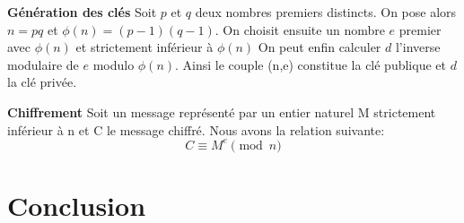\documentclass[a4paper,12pt]{article}
\begin{document}
\textbf{Génération des clés}
Soit $p$ et $q$ deux nombres premiers distincts. On pose alors $n=pq$ et $\phi(n)=(p-1)(q-1)$.
On choisit ensuite un nombre $e$ premier avec $\phi(n)$ et strictement inférieur à $\phi(n)$
On peut enfin calculer $d$ l'inverse modulaire de $e$ modulo $\phi(n)$.
Ainsi le couple (n,e) constitue la clé publique et $d$ la clé privée.


\textbf{Chiffrement}
Soit un message représenté par un entier naturel M strictement inférieur à n et C le message chiffré.
Nous avons la relation suivante:
\[
C \equiv M^e \pmod{n}
\]

\section{Conclusion}
\end{document}
